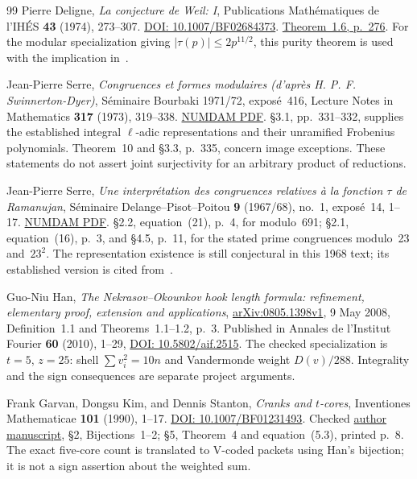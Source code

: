 \begin{thebibliography}{99}
Pierre Deligne, \emph{La conjecture de Weil: I},
Publications Math\'ematiques de l'IH\'ES \textbf{43} (1974), 273--307.
\href{https://doi.org/10.1007/BF02684373}{DOI: 10.1007/BF02684373}.
\href{https://www.numdam.org/article/PMIHES_1974__43__273_0.pdf}{Theorem~1.6, p.~276}.
For the modular specialization giving $|\tau(p)|\le2p^{11/2}$, this purity theorem is used with the implication in~\cite{DeligneModular}.

Jean-Pierre Serre, \emph{Congruences et formes modulaires (d'apr\`es H. P. F. Swinnerton-Dyer)},
S\'eminaire Bourbaki 1971/72, expos\'e~416, Lecture Notes in Mathematics \textbf{317} (1973), 319--338.
\href{https://www.numdam.org/item/SB_1971-1972__14__319_0.pdf}{NUMDAM PDF}.
\S3.1, pp.~331--332, supplies the established integral $\ell$-adic representations and their unramified Frobenius polynomials. Theorem~10 and \S3.3, p.~335, concern image exceptions. These statements do not assert joint surjectivity for an arbitrary product of reductions.

Jean-Pierre Serre, \emph{Une interpr\'etation des congruences relatives \`a la fonction $\tau$ de Ramanujan},
S\'eminaire Delange--Pisot--Poitou \textbf{9} (1967/68), no.~1, expos\'e~14, 1--17.
\href{https://www.numdam.org/item/SDPP_1967-1968__9_1_A13_0.pdf}{NUMDAM PDF}.
\S2.2, equation~(21), p.~4, for modulo~691; \S2.1, equation~(16), p.~3, and \S4.5, p.~11, for the stated prime congruences modulo~23 and~$23^2$.
The representation existence is still conjectural in this 1968 text; its established version is cited from~\cite{SerreBourbaki}.

Guo-Niu Han, \emph{The Nekrasov--Okounkov hook length formula: refinement, elementary proof, extension and applications},
\href{https://arxiv.org/pdf/0805.1398}{arXiv:0805.1398v1}, 9 May 2008,
Definition~1.1 and Theorems~1.1--1.2, p.~3.
Published in Annales de l'Institut Fourier \textbf{60} (2010), 1--29,
\href{https://doi.org/10.5802/aif.2515}{DOI: 10.5802/aif.2515}.
The checked specialization is $t=5$, $z=25$: shell $\sum v_i^2=10n$ and Vandermonde weight $D(v)/288$. Integrality and the sign consequences are separate project arguments.

Frank Garvan, Dongsu Kim, and Dennis Stanton, \emph{Cranks and $t$-cores},
Inventiones Mathematicae \textbf{101} (1990), 1--17.
\href{https://doi.org/10.1007/BF01231493}{DOI: 10.1007/BF01231493}.
Checked \href{https://www-users.cse.umn.edu/~stant001/PAPERS/cra2.pdf}{author manuscript},
\S2, Bijections~1--2; \S5, Theorem~4 and equation~(5.3), printed p.~8.
The exact five-core count is translated to V-coded packets using Han's bijection; it is not a sign assertion about the weighted sum.


\end{thebibliography}
